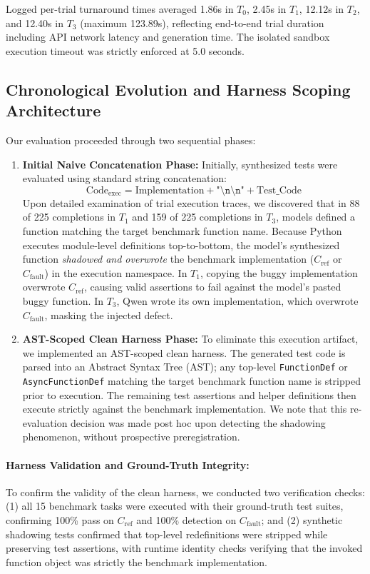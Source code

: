 \documentclass[11pt,a4paper]{article}
\begin{document}
Logged per-trial turnaround times averaged 1.86s in $T_0$, 2.45s in $T_1$, 12.12s in $T_2$, and 12.40s in $T_3$ (maximum 123.89s), reflecting end-to-end trial duration including API network latency and generation time. The isolated sandbox execution timeout was strictly enforced at 5.0 seconds.

\subsection{Chronological Evolution and Harness Scoping Architecture}
\label{sec:harness_arch}
Our evaluation proceeded through two sequential phases:
\begin{enumerate}
    \item \textbf{Initial Naive Concatenation Phase:} Initially, synthesized tests were evaluated using standard string concatenation:
    \begin{equation}
        \text{Code}_{\text{exec}} = \text{Implementation} + \texttt{"\textbackslash n\textbackslash n"} + \text{Test\_Code}
    \end{equation}
    Upon detailed examination of trial execution traces, we discovered that in 88 of 225 completions in $T_1$ and 159 of 225 completions in $T_3$, models defined a function matching the target benchmark function name. Because Python executes module-level definitions top-to-bottom, the model's synthesized function \textit{shadowed and overwrote} the benchmark implementation ($C_{\text{ref}}$ or $C_{\text{fault}}$) in the execution namespace. In $T_1$, copying the buggy implementation overwrote $C_{\text{ref}}$, causing valid assertions to fail against the model's pasted buggy function. In $T_3$, Qwen wrote its own implementation, which overwrote $C_{\text{fault}}$, masking the injected defect.
    \item \textbf{AST-Scoped Clean Harness Phase:} To eliminate this execution artifact, we implemented an AST-scoped clean harness. The generated test code is parsed into an Abstract Syntax Tree (AST); any top-level \texttt{FunctionDef} or \texttt{AsyncFunctionDef} matching the target benchmark function name is stripped prior to execution. The remaining test assertions and helper definitions then execute strictly against the benchmark implementation. We note that this re-evaluation decision was made post hoc upon detecting the shadowing phenomenon, without prospective preregistration.
\end{enumerate}

\paragraph{Harness Validation and Ground-Truth Integrity:}
To confirm the validity of the clean harness, we conducted two verification checks: (1) all 15 benchmark tasks were executed with their ground-truth test suites, confirming 100\% pass on $C_{\text{ref}}$ and 100\% detection on $C_{\text{fault}}$; and (2) synthetic shadowing tests confirmed that top-level redefinitions were stripped while preserving test assertions, with runtime identity checks verifying that the invoked function object was strictly the benchmark implementation.
\end{document}
